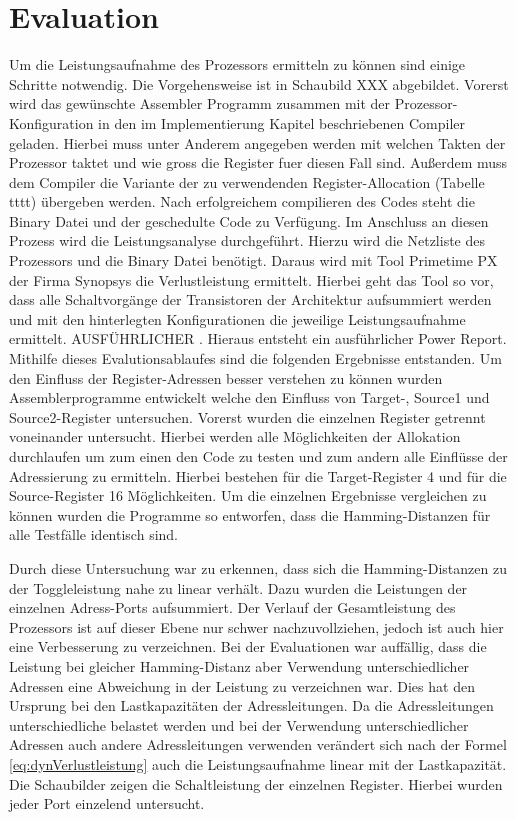 \chapter{Evaluation}
\label{chap:evaluation}
Um die Leistungsaufnahme des Prozessors ermitteln zu können sind einige Schritte notwendig. Die Vorgehensweise ist in Schaubild XXX abgebildet. 
Vorerst wird das gewünschte Assembler Programm zusammen mit der Prozessor-Konfiguration in den im Implementierung Kapitel beschriebenen Compiler geladen. Hierbei muss unter Anderem angegeben werden mit welchen Takten der Prozessor taktet und wie gross die Register fuer diesen Fall sind. Außerdem muss dem Compiler die Variante der zu verwendenden Register-Allocation (Tabelle tttt) übergeben werden. Nach erfolgreichem compilieren des Codes steht die Binary Datei und der geschedulte Code zu Verfügung. Im Anschluss an diesen Prozess wird die Leistungsanalyse durchgeführt. Hierzu wird die Netzliste des Prozessors und die Binary Datei benötigt. Daraus wird mit Tool Primetime PX der Firma Synopsys die Verlustleistung ermittelt. Hierbei geht das Tool so vor, dass alle Schaltvorgänge der Transistoren der Architektur aufsummiert werden und mit den hinterlegten Konfigurationen die jeweilige Leistungsaufnahme ermittelt. AUSFÜHRLICHER . Hieraus entsteht ein ausführlicher Power Report. 
Mithilfe dieses Evalutionsablaufes sind die folgenden Ergebnisse entstanden.
Um den Einfluss der Register-Adressen besser verstehen zu können wurden Assemblerprogramme entwickelt welche den Einfluss von Target-, Source1 und Source2-Register untersuchen. Vorerst wurden die einzelnen Register getrennt voneinander untersucht. Hierbei werden alle Möglichkeiten der Allokation durchlaufen um zum einen den Code zu testen und zum andern alle Einflüsse der Adressierung zu ermitteln. Hierbei bestehen für die Target-Register 4 und für die Source-Register 16 Möglichkeiten. Um die einzelnen Ergebnisse vergleichen zu können wurden die Programme so entworfen, dass die Hamming-Distanzen für alle Testfälle identisch sind. 

Durch diese Untersuchung war zu erkennen, dass sich die Hamming-Distanzen zu der Toggleleistung nahe zu linear verhält. Dazu wurden die Leistungen der einzelnen Adress-Ports aufsummiert. Der Verlauf der Gesamtleistung des Prozessors ist auf dieser Ebene nur schwer nachzuvollziehen, jedoch ist auch hier eine Verbesserung zu verzeichnen. 
Bei der Evaluationen war auffällig, dass die Leistung bei gleicher Hamming-Distanz aber Verwendung unterschiedlicher Adressen eine Abweichung in der Leistung zu verzeichnen war. Dies hat den Ursprung bei den Lastkapazitäten der Adressleitungen. Da die Adressleitungen unterschiedliche belastet werden und bei der Verwendung unterschiedlicher Adressen auch andere Adressleitungen verwenden verändert sich nach der Formel \ref{eq:dynVerlustleistung} auch die Leistungsaufnahme linear mit der Lastkapazität. 
Die Schaubilder zeigen die Schaltleistung der einzelnen Register. Hierbei wurden jeder Port einzelend untersucht. 

